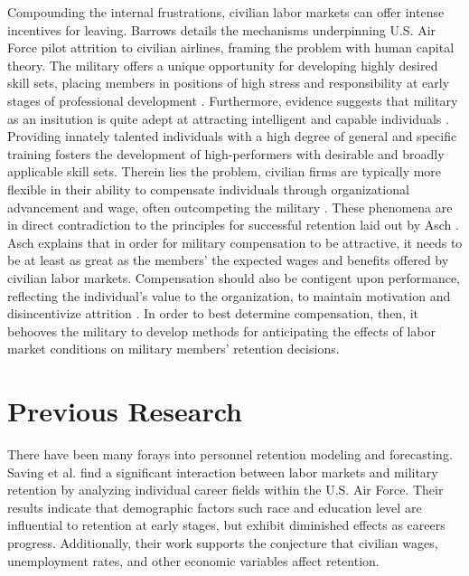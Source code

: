 \documentclass[12pt,letterpaper,toc=flat,oneside]{report}
\theoremstyle{definition}
\theoremstyle{definition}
\theoremstyle{definition}
\theoremstyle{remark}
\begin{document}
Compounding the internal frustrations, civilian labor markets can offer
intense incentives for leaving. Barrows \cite{barrows-1993} details the
mechanisms underpinning U.S. Air Force pilot attrition to civilian
airlines, framing the problem with human capital theory. The military
offers a unique opportunity for developing highly desired skill sets,
placing members in positions of high stress and responsibility at early
stages of professional development \cite{kane-2012}. Furthermore,
evidence suggests that military as an insitution is quite adept at
attracting intelligent and capable individuals \cite{asch-hosek-2004}.
Providing innately talented individuals with a high degree of general
and specific training fosters the development of high-performers with
desirable and broadly applicable skill sets. Therein lies the problem,
civilian firms are typically more flexible in their ability to
compensate individuals through organizational advancement and wage,
often outcompeting the military \cite{kane-2012}. These phenomena are in
direct contradiction to the principles for successful retention laid out
by Asch \cite{asch-1993}. Asch explains that in order for military
compensation to be attractive, it needs to be at least as great as the
members' the expected wages and benefits offered by civilian labor
markets. Compensation should also be contigent upon performance,
reflecting the individual's value to the organization, to maintain
motivation and disincentivize attrition \cite{asch-1993}. In order to
best determine compensation, then, it behooves the military to develop
methods for anticipating the effects of labor market conditions on
military members' retention decisions.

\hypertarget{previous-research}{%
\section{Previous Research}\label{previous-research}}

There have been many forays into personnel retention modeling and
forecasting. Saving et al. \cite{saving-etal-1985} find a significant
interaction between labor markets and military retention by analyzing
individual career fields within the U.S. Air Force. Their results
indicate that demographic factors such race and education level are
influential to retention at early stages, but exhibit diminished effects
as careers progress. Additionally, their work supports the conjecture
that civilian wages, unemployment rates, and other economic variables
affect retention.
\end{document}
